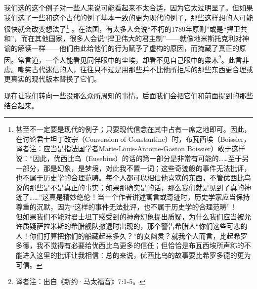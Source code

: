 我们选的这个例子对一些人来说可能看起来不太合适，因为它太过明显了。但如果我们选了一些和这个古代的例子基本一致的更为现代的例子，那些这样想的人可能很快就会改变想法了\footnote{甚至不一定要是现代的例子；只要现代信念在其中占有一席之地即可。因此，在讨论君士坦丁改宗（Conversion of Constantine）时，布瓦西埃（Boissier，译者注：应当是指法国学者Marie-Louis-Antoine-Gaston Boissier）敢于这样说：“因此，优西比乌（Eusebius）的话的第一部分是非常有可能的……至于另一部分，那是幻象，是梦境，对此我不置一词；这些奇迹般的事件无法批评，也不属于历史学的合理范畴。每个人都可以相信他喜欢的东西，不管优西比乌说的那些是不是真正的事实；如果那确实是的话，那么我们就是见到了真的神迹了……”\parencite[p.~39]{boissier_fin_1894}这真是精妙绝伦！当一个作者讲述寓言或奇迹时，历史学家应当保持尊重的沉默，因为“这样的事件无法批评，也不属于历史学的合理范畴”！\\
    \setlength{\parindent}{2em}
    \indent
    但如果我们不能对君士坦丁感受到的神奇幻象提出质疑，为什么我们应当被允许质疑萨拉米斯的希腊舰队撤退时出现的，那个警告希腊人“你们这些可悲的人！你们打算把你们的船藏起来多久？”的女幽灵？就我个人而言，比起希罗多德，我不觉得有必要给优西比乌更多的信任；但恰恰是布瓦西埃所声称的不能进入这里的批评让我相信：总的来说，优西比乌的故事要比希罗多德的更为可信。}
。在法国，有太多人会说“不朽的1789年原则”或是“捍卫共和”，而在其他国家，很多人会说“捍卫伟大的君主制”——就像地米斯托克利对神谕的解读一样——他们由此给他们的行为赋予了虚构的原因，而掩藏了真正的原因。常言道，一个人能看见同伴眼中的尘埃，却看不见自己眼中的梁木\footnote{译者注：出自《新约·马太福音》7:1-5。}。此言非虚。嘲笑古代迷信的人，往往只不过是用那些并不比他所拒斥的那些东西更合理或更真实的现代版本替换了它们。

现在让我们转向一些没那么众所周知的事情。后面我们会把它们和前面提到的那些结合起来。
